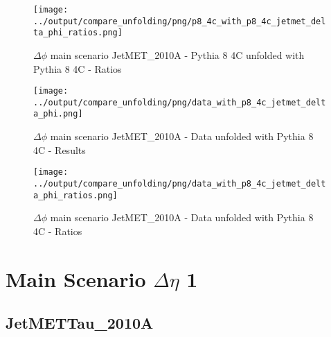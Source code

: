 \documentclass[11pt]{book}
\begin{document}
\begin{figure}[ht]
\centering
\texttt{[image: ../output/compare\_unfolding/png/p8\_4c\_with\_p8\_4c\_jetmet\_delta\_phi\_ratios.png]}
\caption{$\Delta\phi$ main scenario JetMET\_2010A - Pythia 8 4C unfolded with Pythia 8 4C - Ratios}
\label{p8_p8_jetmet_delta_phi_b}
\end{figure}

\begin{comment}
\begin{figure}[ht]
\centering
\texttt{[image: ../output/compare\_unfolding/png/p6\_z2\_with\_p8\_4c\_jetmet\_delta\_phi.png]}
\caption{$\Delta\phi$ main scenario JetMET\_2010A - Pythia 6 Z2* unfolded with Pythia 8 4C - Results}
\label{p6_p8_jetmet_delta_phi_a}
\end{figure}

\begin{figure}[ht]
\centering
\texttt{[image: ../output/compare\_unfolding/png/p6\_z2\_with\_p8\_4c\_jetmet\_delta\_phi\_ratios.png]}
\caption{$\Delta\phi$ main scenario JetMET\_2010A - Pythia 6 Z2* unfolded with Pythia 8 4C - Ratios}
\label{p6_p8_jetmet_delta_phi_b}
\end{figure}
\end{comment}

\begin{figure}[ht]
\centering
\texttt{[image: ../output/compare\_unfolding/png/data\_with\_p8\_4c\_jetmet\_delta\_phi.png]}
\caption{$\Delta\phi$ main scenario JetMET\_2010A - Data unfolded with Pythia 8 4C - Results}
\label{data_p8_jetmet_delta_phi_a}
\end{figure}

\begin{figure}[ht]
\centering
\texttt{[image: ../output/compare\_unfolding/png/data\_with\_p8\_4c\_jetmet\_delta\_phi\_ratios.png]}
\caption{$\Delta\phi$ main scenario JetMET\_2010A - Data unfolded with Pythia 8 4C - Ratios}
\label{data_p8_jetmet_delta_phi_b}
\end{figure}


\clearpage
\chapter{Main Scenario $\Delta\eta$ 1 }
\section{JetMETTau\_2010A}
\end{document}
